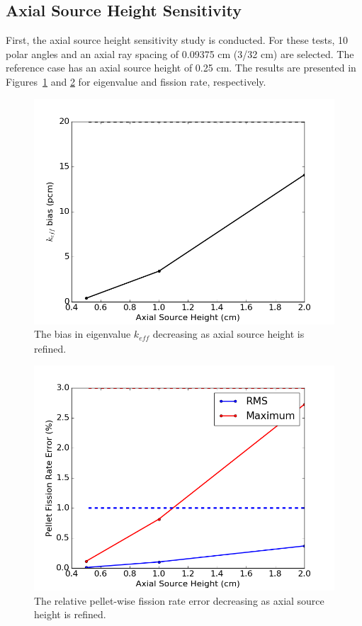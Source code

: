 \subsection{Axial Source Height Sensitivity}
\label{sec:axial-source-height-sensitivity}

First, the axial source height sensitivity study is conducted. For these tests, 10 polar angles and an axial ray spacing of 0.09375 cm (3/32 cm) are selected. The reference case has an axial source height of 0.25 cm. The results are presented in Figures~\ref{fig:axial-sh-pcm} and \ref{fig:axial-sh-fr} for eigenvalue and fission rate, respectively. 

\begin{figure}[h!]
	\centering
	\includegraphics[width=0.65\linewidth]{figures/results/sensitivity/source_height_pcm.png}
	\caption[]{The bias in eigenvalue $k_{\textit{eff}}$ decreasing as axial source height is refined.}
	\label{fig:axial-sh-pcm}
\end{figure}
\begin{figure}[h!]
	\centering
	\includegraphics[width=0.65\linewidth]{figures/results/sensitivity/source_height_fr.png}
	\caption[]{The relative pellet-wise fission rate error decreasing as axial source height is refined.}
	\label{fig:axial-sh-fr}
\end{figure}

